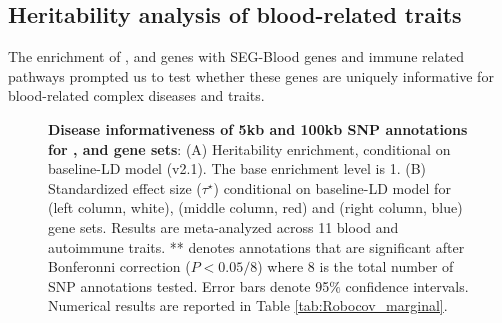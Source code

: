 \subsection*{Heritability analysis of blood-related traits}

The enrichment of \Robospan{}, \pRobospan{} and \Corspan{} genes with SEG-Blood genes and immune related pathways prompted us to test whether these genes are uniquely informative for blood-related complex diseases and traits.

\begin{figure}[!tpb]
\centering
{}
\caption{\small {\textbf{Disease informativeness of 5kb and 100kb SNP annotations for \Corspan{}, \Robospan{} and \pRobospan{} gene sets}: (A) Heritability enrichment, conditional on baseline-LD model (v2.1). The base enrichment level is 1. (B) Standardized effect size ($\tau^{\star}$) conditional on baseline-LD model for \Corspan{} (left column, white), \Robospan{} (middle column, red) and \pRobospan{} (right column, blue) gene sets. Results are meta-analyzed across 11 blood and autoimmune traits. ** denotes annotations that are significant after Bonferonni correction ($P < 0.05/8$) where $8$ is the total number of SNP annotations tested. Error bars denote 95$\%$ confidence intervals. Numerical results are reported in Table \ref{tab:Robocov_marginal}.}}
\label{fig:Robocov_marginal}
\end{figure}

